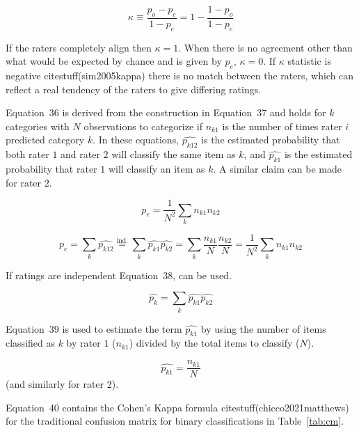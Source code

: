 \documentclass[preprint,12pt]{elsarticle}
\begin{document}
\begin{equation}
	\kappa \equiv {\frac {p_{o}-p_{e}}{1-p_{e}}}=1-{\frac {1-p_{o}}{1-p_{e}}}
	\label{eqn:35}
\end{equation}

If the raters completely align then $\kappa = 1$. When there is no agreement other than what would be expected by chance and is given by $p_{e}$, $\kappa = 0$. If $\kappa$ statistic is negative citestuff(sim2005kappa) there is no match between the raters, which can reflect a real tendency of the raters to give differing ratings.

Equation~36 is derived from the construction in Equation~37 and holds for $k$ categories with $N$ observations to categorize if $n_{k1}$ is the number of times rater $i$ predicted category $k$. In these equations, ${\widehat{p_{k12}}}$ is the estimated probability that both rater $1$ and rater $2$ will classify the same item as $k$, and ${\widehat {p_{k1}}}$ is the estimated probability that rater $1$ will classify an item as $k$. A similar claim can be made for rater $2$.

\begin{equation}
	p_{e}={\frac {1}{N^{2}}}\sum_{k}n_{k1}n_{k2}
	\label{eqn:36}
\end{equation}

\begin{equation}
	p_{e}=\sum_{k}{\widehat {p_{k12}}}{\overset{\text{ind.}}{=}}\sum_{k}{\widehat {p_{k1}}}{\widehat {p_{k2}}}=\sum_{k}{\frac {n_{k1}}{N}}{\frac {n_{k2}}{N}}={\frac {1}{N^{2}}}\sum_{k}n_{k1}n_{k2}
	\label{eqn:37}
\end{equation}

If ratings are independent Equation~38, can be used.

\begin{equation}
	\textstyle{\widehat{p_{k}}}=\sum_{k}{\widehat{p_{k1}}}{\widehat {p_{k2}}}
	\label{eqn:38}
\end{equation}

Equation~39 is used to estimate the term $\widehat{p_{k1}}$ by using the number of items classified as $k$ by rater $1$ ($n_{k1}$) divided by the total items to classify ($N$).

\begin{equation}
	\widehat {p_{k1}}=\frac{n_{k1}}{N}
	\label{eqn:39}
\end{equation}
 (and similarly for rater $2$).
 
Equation~40 contains the Cohen's Kappa formula citestuff(chicco2021matthews) for the traditional confusion matrix for binary classifications in Table~\ref{tab:cm}.
\end{document}

